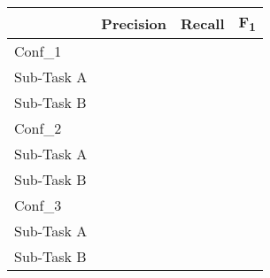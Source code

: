 \documentclass[11pt,a4paper]{article}
\begin{document}
\begin{table}[!h]
\begin{center}
\begin{tabular}{|l|r|r|r|}
\hline\centering\textbf{}  & \textbf{Precision} &  \textbf{Recall} &  \textbf{F\textsubscript{1}}\\
\hline
Conf\_1 & & & \\
\hline
 Sub-Task A   &   &  &  \\
 Sub-Task B   &   &  &  \\
\hline
\hline
Conf\_2 & & & \\
\hline
 Sub-Task A   &   &  &  \\
 Sub-Task B   &   &  &  \\
\hline
\hline
Conf\_3 & & & \\
\hline
 Sub-Task A   &   &  &  \\
 Sub-Task B   &   &  &  \\
\hline
\hline
\end{tabular}
\end{center}
\caption{\label{}}
\end{table}



\begin{comment}
low	TRUE
simple	TRUE
stopwords	TRUE

[[256, 10], [256, 7], [256, 5], [256, 3], [256, 2], [256, 1]]
kernel_initializer=random_uniform
de-wiki-fasttext-300d-1M
dropout_p = 0.5
fully_connected_layers=2
adam
batch_size=128,
shuffle=True,
validation_split=0.4,
verbose=1,
epochs=250
filtered = np.array(len(labels2idx) * [0.4])


subtask_a			subtask_b
Precision	0.8389		Precision	0.6733
Recall	0.7659		Recall	0.5032
F1	0.8008		F1	0.576
\end{comment}



\begin{comment}

classifier			tokenisation schema
[[256, 10], [256, 7], [256, 5], [256, 3], [256, 2], [256, 1]]			low	TRUE
kernel_initializer=random_uniform			simple	TRUE
de-wiki-fasttext-300d-1M			stopwords	TRUE
dropout_p = 0.5
fully_connected_layers=2
adam
batch_size=128,
shuffle=True,
validation_split=0.4,
verbose=1,
epochs=500
filtered = np.array(len(labels2idx) * [0.4])

subtask_a			subtask_b
Precision	0.7875		Precision	0.6235
Recall	0.7942		Recall	0.5066
F1	0.7908		F1	0.559
\begin{comment}


\begin{comment}
[[256, 10], [256, 7], [256, 5], [256, 3], [256, 2], [256, 1]]
dropout_p = 0.5
fully_connected_layers=2
adam
batch_size=128,
shuffle=True,
epochs=250

subtask_a			subtask_b
Precision	0.3355		Precision	0.2381
Recall	0.6256		Recall	0.3057
F1	0.4368		F1	0.2677
\end{comment}
\end{document}
